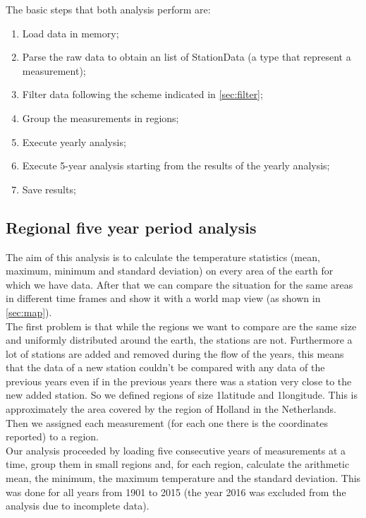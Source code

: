 \documentclass{vldb}
\begin{document}
The basic steps that both analysis perform are:
\begin{enumerate}
    \item Load data in memory;
    \item Parse the raw data to obtain an list of StationData (a type that represent a measurement);
    \item Filter data following the scheme indicated in \ref{sec:filter};
    \item Group the measurements in regions;
    \item Execute yearly analysis;
    \item Execute 5-year analysis starting from the results of the yearly analysis;
    \item Save results;
\end{enumerate}

\subsection{Regional five year period analysis}
The aim of this analysis is to calculate the temperature statistics (mean, maximum, minimum and standard deviation) on every area of the earth for which we have data. After that we can compare the situation for the same areas in different time frames and show it with a world map view (as shown in \ref{sec:map}). \\
The first problem is that while the regions we want to compare are the same size and uniformly distributed around the earth, the stations are not. Furthermore a lot of stations are added and removed during the flow of the years, this means that the data of a new station couldn't be compared with any data of the previous years even if in the previous years there was a station very close to the new added station. So we defined regions of size 1\degree latitude and 1\degree longitude. This is approximately the area covered by the region of Holland in the Netherlands. Then we assigned each measurement (for each one there is the coordinates reported) to a region. \\
Our analysis proceeded by loading five consecutive years of measurements at a time, group them in small regions and, for each region, calculate the arithmetic mean, the minimum, the maximum temperature and the standard deviation. This was done for all years from 1901 to 2015 (the year 2016 was excluded from the analysis due to incomplete data).\\
\end{document}
